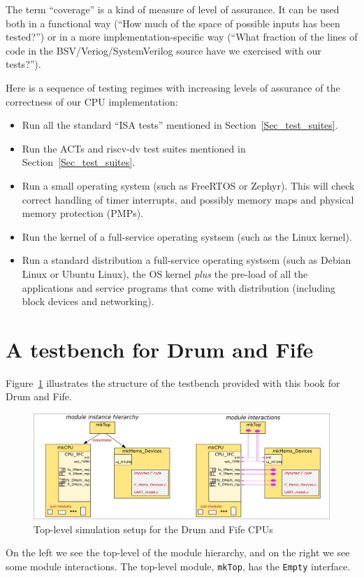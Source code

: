 The term ``coverage'' is a kind of measure of level of assurance.  It
can be used both in a functional way (``How much of the space of
possible inputs has been tested?'') or in a more
implementation-specific way (``What fraction of the lines of code in
the BSV/Veriog/SystemVerilog source have we exercised with our
tests?'').

Here is a sequence of testing regimes with increasing levels of
assurance of the correctness of our CPU implementation:

\begin{itemize}
 \item Run all the standard ``ISA tests'' mentioned in Section~\ref{Sec_test_suites}.

 \item Run the ACTs and riscv-dv test suites mentioned in Section~\ref{Sec_test_suites}.

 \item Run a small operating system (such as FreeRTOS or Zephyr).
       This will check correct handling of timer interrupts, and
       possibly memory maps and physical memory protection (PMPs).

 \item Run the kernel of a full-service operating systsem (such as the Linux kernel).

 \item Run a standard distribution a full-service operating systsem
       (such as Debian Linux or Ubuntu Linux), {\ie} the OS kernel
       \emph{plus} the pre-load of all the applications and service
       programs that come with distribution (including block devices
       and networking).

\end{itemize}


\section{A testbench for Drum and Fife}

Figure~\ref{Fig_CPU_Simulation} illustrates the structure of the
testbench provided with this book for Drum and Fife.
\begin{figure}[htbp]
  \centerline{\includegraphics[width=6in,angle=0]{Figures/Fig_CPU_Simulation}}
  \caption{\label{Fig_CPU_Simulation}
           Top-level simulation setup for the Drum and Fife CPUs}
\end{figure}
On the left we see the top-level of the module hierarchy, and on the
right we see some module interactions.  The top-level module,
\verb|mkTop|, has the \verb|Empty| interface.

